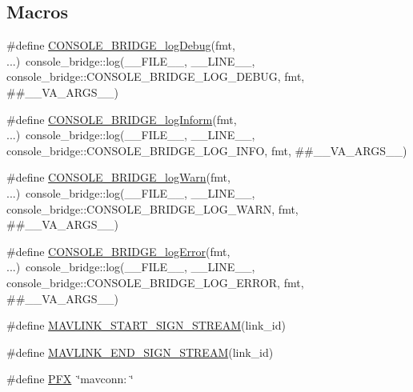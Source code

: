 \subsection*{Macros}
\begin{DoxyCompactItemize}
\item 
\#define \mbox{\hyperlink{group__mavconn_gaaf4116dec671bee3f8f1445f6c6a3ebe}{C\+O\+N\+S\+O\+L\+E\+\_\+\+B\+R\+I\+D\+G\+E\+\_\+log\+Debug}}(fmt, ...)~console\+\_\+bridge\+::log(\+\_\+\+\_\+\+F\+I\+L\+E\+\_\+\+\_\+, \+\_\+\+\_\+\+L\+I\+N\+E\+\_\+\+\_\+, console\+\_\+bridge\+::\+C\+O\+N\+S\+O\+L\+E\+\_\+\+B\+R\+I\+D\+G\+E\+\_\+\+L\+O\+G\+\_\+\+D\+E\+B\+UG, fmt, \#\#\+\_\+\+\_\+\+V\+A\+\_\+\+A\+R\+G\+S\+\_\+\+\_\+)
\item 
\#define \mbox{\hyperlink{group__mavconn_gaa587fd17781bdf24e813cb3c43eb8ff2}{C\+O\+N\+S\+O\+L\+E\+\_\+\+B\+R\+I\+D\+G\+E\+\_\+log\+Inform}}(fmt, ...)~console\+\_\+bridge\+::log(\+\_\+\+\_\+\+F\+I\+L\+E\+\_\+\+\_\+, \+\_\+\+\_\+\+L\+I\+N\+E\+\_\+\+\_\+, console\+\_\+bridge\+::\+C\+O\+N\+S\+O\+L\+E\+\_\+\+B\+R\+I\+D\+G\+E\+\_\+\+L\+O\+G\+\_\+\+I\+N\+FO, fmt, \#\#\+\_\+\+\_\+\+V\+A\+\_\+\+A\+R\+G\+S\+\_\+\+\_\+)
\item 
\#define \mbox{\hyperlink{group__mavconn_ga57a50f2283a7b43395b93a31ac90461c}{C\+O\+N\+S\+O\+L\+E\+\_\+\+B\+R\+I\+D\+G\+E\+\_\+log\+Warn}}(fmt, ...)~console\+\_\+bridge\+::log(\+\_\+\+\_\+\+F\+I\+L\+E\+\_\+\+\_\+, \+\_\+\+\_\+\+L\+I\+N\+E\+\_\+\+\_\+, console\+\_\+bridge\+::\+C\+O\+N\+S\+O\+L\+E\+\_\+\+B\+R\+I\+D\+G\+E\+\_\+\+L\+O\+G\+\_\+\+W\+A\+RN, fmt, \#\#\+\_\+\+\_\+\+V\+A\+\_\+\+A\+R\+G\+S\+\_\+\+\_\+)
\item 
\#define \mbox{\hyperlink{group__mavconn_ga78bfb8423a8c11242fba38b8b3952aa7}{C\+O\+N\+S\+O\+L\+E\+\_\+\+B\+R\+I\+D\+G\+E\+\_\+log\+Error}}(fmt, ...)~console\+\_\+bridge\+::log(\+\_\+\+\_\+\+F\+I\+L\+E\+\_\+\+\_\+, \+\_\+\+\_\+\+L\+I\+N\+E\+\_\+\+\_\+, console\+\_\+bridge\+::\+C\+O\+N\+S\+O\+L\+E\+\_\+\+B\+R\+I\+D\+G\+E\+\_\+\+L\+O\+G\+\_\+\+E\+R\+R\+OR, fmt, \#\#\+\_\+\+\_\+\+V\+A\+\_\+\+A\+R\+G\+S\+\_\+\+\_\+)
\item 
\#define \mbox{\hyperlink{group__mavconn_ga1f3837374fc2bc427cb2e9a574ed3c97}{M\+A\+V\+L\+I\+N\+K\+\_\+\+S\+T\+A\+R\+T\+\_\+\+S\+I\+G\+N\+\_\+\+S\+T\+R\+E\+AM}}(link\+\_\+id)
\item 
\#define \mbox{\hyperlink{group__mavconn_ga72178fe89f317958886bb3233c6a9e42}{M\+A\+V\+L\+I\+N\+K\+\_\+\+E\+N\+D\+\_\+\+S\+I\+G\+N\+\_\+\+S\+T\+R\+E\+AM}}(link\+\_\+id)
\item 
\#define \mbox{\hyperlink{group__mavconn_ga176e4c39a833f4d01f0ecd322c0f4343}{P\+FX}}~\char`\"{}mavconn\+: \char`\"{}

\end{DoxyCompactItemize}
